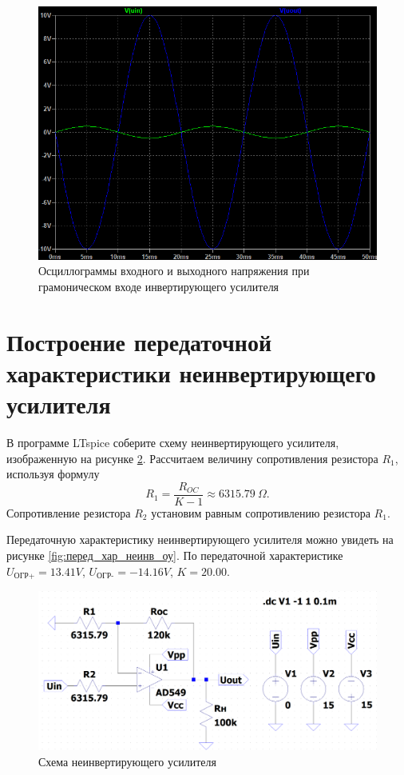 \begin{figure}[H]
    \centering
    \includegraphics[width=\textwidth]{figs/иссл_раб_инв_усл.png}
    \caption{Осциллограммы входного
    и выходного напряжения при грамоническом входе инвертирующего усилителя}
    \label{fig:иссл_раб_инв_усл}
\end{figure}


\section*{Построение передаточной характеристики неинвертирующего усилителя}

В программе LTspice соберите схему неинвертирующего усилителя,
изображенную на рисунке \ref{fig:перед_хар_неинв_оу_схема}. Рассчитаем величину сопротивления резистора $R_1$, 
используя формулу
\begin{equation*}
    R_1=\frac{R_{OC}}{K-1}\approx 6315.79\ \Omega.
\end{equation*}
Сопротивление резистора $R_2$ установим равным сопротивлению резистора $R_1$.

Передаточную характеристику неинвертирующего усилителя можно увидеть на рисунке
\ref{fig:перед_хар_неинв_оу}. По передаточной характеристике $U_{\text{ОГР+}}=13.41V$, 
$U_{\text{ОГР-}}=-14.16V$, $K=20.00$.

\begin{figure}[H]
    \centering
    \includegraphics[width=\textwidth]{figs/перед_хар_неинв_оу_схема.png}
    \caption{Схема неинвертирующего усилителя}
    \label{fig:перед_хар_неинв_оу_схема}
\end{figure}

